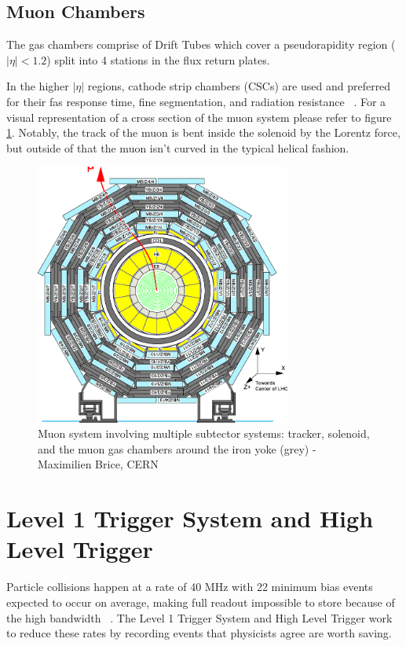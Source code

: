 \subsection{Muon Chambers} 
The gas chambers comprise of Drift Tubes which cover a pseudorapidity region ($|\eta|<1.2$) split into 4 stations in the flux return plates.

In the higher $|\eta|$ regions, cathode strip chambers (CSCs) are used and preferred for their fas response time, fine segmentation, and radiation resistance ~\cite{Chatrchyan:1129810}. For a visual representation of a cross section of the muon system please refer to figure \ref{fig:muonsystem}. Notably, the track of the muon is bent inside the solenoid by the Lorentz force, but outside of that the muon isn't curved in the typical helical fashion. 

\begin{figure}[ht!b]
  \centering
\includegraphics[width=0.75\textwidth]{figures/Layout-of-the-CMS-barrel-muon-DT-chambers-in-one-of-the-5-wheels-59.png}    
    \caption{\label{fig:muonsystem} Muon system involving multiple subtector systems: tracker, solenoid, and the muon gas chambers around the iron yoke (grey) - Maximilien Brice, CERN }
\end{figure}


\section{Level 1 Trigger System and High Level Trigger}
Particle collisions happen at a rate of 40 MHz with 22 minimum bias events expected to occur on average, making full readout impossible to store because of the high bandwidth ~\cite{Bruning:782076,Foudas:2232067}. The Level 1 Trigger System and High Level Trigger work to reduce these rates by recording events that physicists agree are worth saving. 

